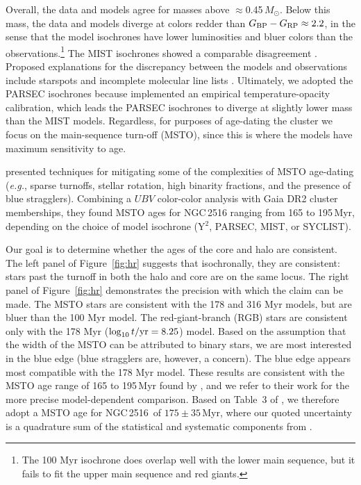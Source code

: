 \documentclass[12pt,twocolumn,tighten]{aastex63}
\newcommand{\cn}{NGC\,2516} %
\newcommand{\bpmrp}{G_{\rm BP}-G_{\rm RP}}
\begin{document}
Overall, the data and models agree for masses above
$\approx$0.45\,$M_\odot$.  Below this mass, the data and models
diverge at colors redder than $\bpmrp\approx2.2$, in
the sense that the model isochrones have lower luminosities and bluer
colors than the observations.\footnote{The 100 Myr isochrone does
overlap well with the lower main sequence, but it fails to fit the
upper main sequence and red giants.}  The MIST isochrones showed a
comparable disagreement \citep{choi_mesa_2016}.  Proposed explanations
for the discrepancy between the models and observations include
starspots and incomplete molecular line lists \citep[{\it
e.g.},][]{stauffer_why_2003,feiden_magnetic_2013,rajpurohit_effective_2013,mann_spectrothermometry_2013,choi_mesa_2016}.
Ultimately, we adopted the PARSEC isochrones because
\citet{chen_improving_2014} implemented an empirical
temperature-opacity calibration, which leads the PARSEC isochrones to
diverge at slightly lower mass than the MIST models.  Regardless, for
purposes of age-dating the cluster we focus on the main-sequence
turn-off (MSTO), since this is where the models have maximum
sensitivity to age.

\citet{cummings_2018} presented techniques for mitigating some of the
complexities of MSTO age-dating ({\it e.g.}, sparse turnoffs, stellar
rotation, high binarity fractions, and the presence of blue
stragglers).  Combining a $UBV$ color-color analysis with Gaia DR2
cluster memberships, they found MSTO ages for NGC\,2516 ranging from
165 to 195\,Myr, depending on the choice of model isochrone (Y$^2$,
PARSEC, MIST, or SYCLIST).

Our goal is to determine whether the ages of the core and halo are
consistent.  The left panel of Figure~\ref{fig:hr} suggests that
isochronally, they are consistent: stars past the turnoff in both the
halo and core are on the same locus.  The right panel of
Figure~\ref{fig:hr} demonstrates the precision with which the claim
can be made.  The MSTO stars are consistent with the 178 and 316 Myr
models, but are bluer than the 100 Myr model.  The red-giant-branch
(RGB) stars are consistent only with the 178 Myr ($\log_{10} t/{\rm
yr} = 8.25$) model.  Based on the assumption that the width of the
MSTO can be attributed to binary stars, we are most interested in the
blue edge (blue stragglers are, however, a concern).  The blue edge
appears most compatible with the 178 Myr model.  These results are
consistent with the MSTO age range of 165 to 195\,Myr found by
\citet{cummings_2018}, and we refer to their work for the more precise
model-dependent comparison.  Based on Table~3 of
\citet{cummings_2018}, we therefore adopt a MSTO age for \cn\ of
$175\pm35$\,Myr, where our quoted uncertainty is a quadrature sum of
the statistical and systematic components from \cite{cummings_2018}. 
\end{document}

